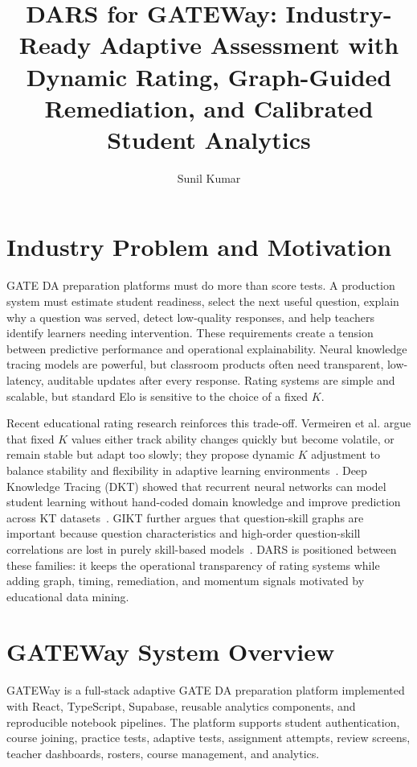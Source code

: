 \documentclass[sigconf,nonacm]{acmart}
\title[DARS for GATEWay]{DARS for GATEWay: Industry-Ready Adaptive Assessment with Dynamic Rating, Graph-Guided Remediation, and Calibrated Student Analytics}
\author{Sunil Kumar}
\affiliation{%
  \institution{GATEWay Adaptive Preparation Platform}
  \city{India}
  \country{India}
}
\begin{document}
\maketitle

\section{Industry Problem and Motivation}
GATE DA preparation platforms must do more than score tests. A production system must estimate student readiness, select the next useful question, explain why a question was served, detect low-quality responses, and help teachers identify learners needing intervention. These requirements create a tension between predictive performance and operational explainability. Neural knowledge tracing models are powerful, but classroom products often need transparent, low-latency, auditable updates after every response. Rating systems are simple and scalable, but standard Elo is sensitive to the choice of a fixed $K$.

Recent educational rating research reinforces this trade-off. Vermeiren et al. argue that fixed $K$ values either track ability changes quickly but become volatile, or remain stable but adapt too slowly; they propose dynamic $K$ adjustment to balance stability and flexibility in adaptive learning environments~\cite{vermeiren2025dynamic}. Deep Knowledge Tracing (DKT) showed that recurrent neural networks can model student learning without hand-coded domain knowledge and improve prediction across KT datasets~\cite{piech2015dkt}. GIKT further argues that question-skill graphs are important because question characteristics and high-order question-skill correlations are lost in purely skill-based models~\cite{yang2020gikt}. DARS is positioned between these families: it keeps the operational transparency of rating systems while adding graph, timing, remediation, and momentum signals motivated by educational data mining.

\section{GATEWay System Overview}
GATEWay is a full-stack adaptive GATE DA preparation platform implemented with React, TypeScript, Supabase, reusable analytics components, and reproducible notebook pipelines. The platform supports student authentication, course joining, practice tests, adaptive tests, assignment attempts, review screens, teacher dashboards, rosters, course management, and analytics.
\end{document}
